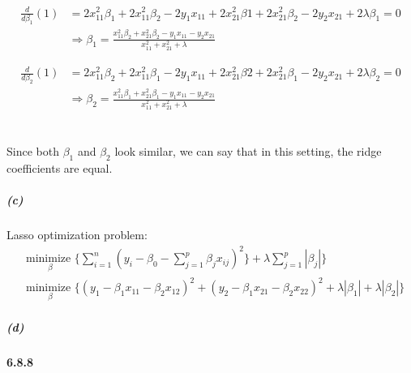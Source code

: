 \documentclass[11pt]{report}
\begin{document}
\begin{align*}
\frac{d}{d\beta_1} (1) &= 2x_{11}^2\beta_{1} + 2x_{11}^2\beta_{2} - 2y_{1}x_{11} + 2x_{21}^2\beta{1} + 2x_{21}^2\beta_{2} - 2y_{2}x_{21} + 2\lambda\beta_{1}= 0
\\&\Rightarrow \beta_{1} = \frac{x_{11}^2\beta_{2} + x_{21}^2\beta_{2} - y_{1}x_{11} - y_{2}x_{21}}{x_{11}^2 + x_{21}^2 + \lambda}
\end{align*}

\begin{align*}
\frac{d}{d\beta_2} (1) &= 2x_{11}^2\beta_{2} + 2x_{11}^2\beta_{1} - 2y_{1}x_{11} + 2x_{21}^2\beta{2} + 2x_{21}^2\beta_{1} - 2y_{2}x_{21} + 2\lambda\beta_{2}= 0
\\&\Rightarrow \beta_{2} = \frac{x_{11}^2\beta_{1} + x_{21}^2\beta_{1} - y_{1}x_{11} - y_{2}x_{21}}{x_{11}^2 + x_{21}^2 + \lambda}
\end{align*}
\\\\Since both $\beta_{1}$ and $\beta_{2}$ look similar, we can say that in this setting, the ridge coefficients are equal.

\subparagraph{(c)}

Lasso optimization problem:
\begin{align*} 
&\underset{\beta}{\text{minimize }}\{\sum_{i=1}^n (y_{i} - \beta_{0} - \sum_{j=1}^p\beta_{j}x_{ij})^2 \}+\lambda\sum_{j=1}^p |\beta_{j}|\}
\\&\underset{\beta}{\text{minimize }}\{(y_{1} - \beta_{1}x_{11} - \beta_{2}x_{12})^2 + (y_{2} - \beta_{1}x_{21} - \beta_{2}x_{22})^2 + \lambda|\beta_{1}| + \lambda|\beta_{2}| \}
\end{align*}

\subparagraph{(d)}

\paragraph{6.8.8 }
\end{document}
